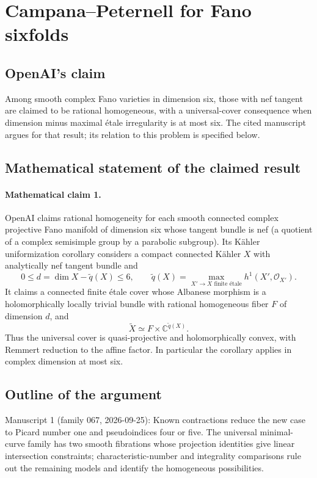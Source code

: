 \documentclass[11pt]{article}
\begin{document}
\section*{Campana–Peternell for Fano sixfolds}

\subsection{OpenAI's claim}
Among smooth complex Fano varieties in dimension six, those with nef tangent are claimed to be rational homogeneous, with a universal-cover consequence when dimension minus maximal étale irregularity is at most six. The cited manuscript argues for that result; its relation to this problem is specified below.

\subsection{Mathematical statement of the claimed result}
\paragraph{Mathematical claim 1.} OpenAI claims rational homogeneity for each smooth connected complex projective Fano manifold of dimension six whose tangent bundle is nef (a quotient of a complex semisimple group by a parabolic subgroup).
Its Kähler uniformization corollary considers a compact connected Kähler $X$ with analytically nef tangent bundle and
\[
0\le d=\dim X-\widetilde q(X)\le6,\qquad
\widetilde q(X)=\max_{X'\to X\text{ finite étale}}h^1(X',\mathcal O_{X'}).
\]
It claims a connected finite étale cover whose Albanese morphism is a holomorphically locally trivial bundle with rational homogeneous fiber $F$ of dimension $d$, and
\[
\widetilde X\simeq F\times\mathbb C^{\widetilde q(X)}.
\]
Thus the universal cover is quasi-projective and holomorphically convex, with Remmert reduction to the affine factor. In particular the corollary applies in complex dimension at most six.

\subsection{Outline of the argument}
Manuscript 1 (family 067, 2026-09-25): Known contractions reduce the new case to Picard number one and pseudoindices four or five. The universal minimal-curve family has two smooth fibrations whose projection identities give linear intersection constraints; characteristic-number and integrality comparisons rule out the remaining models and identify the homogeneous possibilities.
\end{document}
